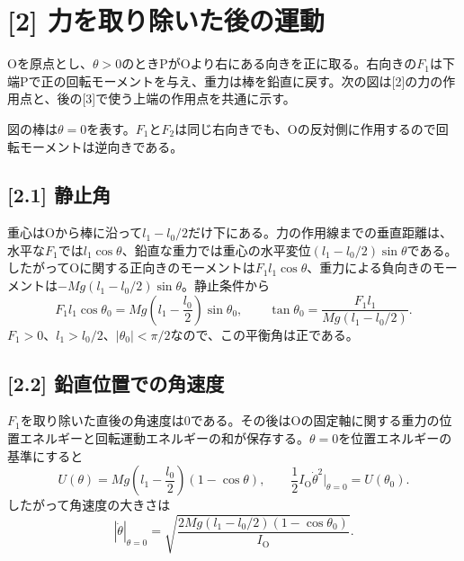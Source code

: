 \documentclass[11pt,a4paper]{article}
\begin{document}
\section*{[2] 力を取り除いた後の運動}
Oを原点とし、$\theta>0$のときPがOより右にある向きを正に取る。右向きの$F_1$は下端Pで正の回転モーメントを与え、重力は棒を鉛直に戻す。次の図は[2]の力の作用点と、後の[3]で使う上端の作用点を共通に示す。
\begin{center}
\end{center}
図の棒は$\theta=0$を表す。$F_1$と$F_2$は同じ右向きでも、Oの反対側に作用するので回転モーメントは逆向きである。

\subsection*{[2.1] 静止角}
重心はOから棒に沿って$l_1-l_0/2$だけ下にある。力の作用線までの垂直距離は、水平な$F_1$では$l_1\cos\theta$、鉛直な重力では重心の水平変位$(l_1-l_0/2)\sin\theta$である。したがってOに関する正向きのモーメントは$F_1l_1\cos\theta$、重力による負向きのモーメントは$-Mg(l_1-l_0/2)\sin\theta$。静止条件から
\[
 F_1l_1\cos\theta_0=Mg\left(l_1-\frac{l_0}{2}\right)\sin\theta_0,
 \qquad
 \boxed{\tan\theta_0=\frac{F_1l_1}{Mg(l_1-l_0/2)}}.
\]
$F_1>0$、$l_1>l_0/2$、$|\theta_0|<\pi/2$なので、この平衡角は正である。

\subsection*{[2.2] 鉛直位置での角速度}
$F_1$を取り除いた直後の角速度は0である。その後はOの固定軸に関する重力の位置エネルギーと回転運動エネルギーの和が保存する。$\theta=0$を位置エネルギーの基準にすると
\[
 U(\theta)=Mg\left(l_1-\frac{l_0}{2}\right)(1-\cos\theta),\qquad
 \frac12 I_{\mathrm O}\dot\theta^2\bigg|_{\theta=0}=U(\theta_0).
\]
したがって角速度の大きさは
\[
 \boxed{\left|\dot\theta\right|_{\theta=0}=
 \sqrt{\frac{2Mg(l_1-l_0/2)(1-\cos\theta_0)}{I_{\mathrm O}}}}.
\]
\end{document}
